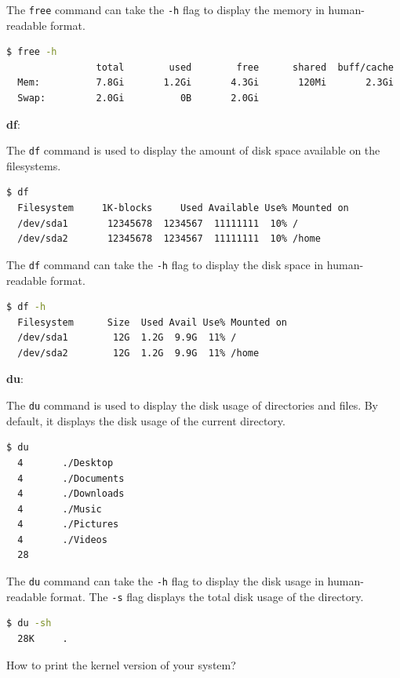 The \texttt{free} command can take the \texttt{-h} flag to display the memory in human-readable format.

\begin{lstlisting}[language=bash]
  $ free -h
                total        used        free      shared  buff/cache   available
  Mem:          7.8Gi       1.2Gi       4.3Gi       120Mi       2.3Gi       4.3Gi
  Swap:         2.0Gi          0B       2.0Gi
\end{lstlisting}

\textbf{df}:

The \texttt{df} command is used to display the amount of disk space available on the filesystems.

\begin{lstlisting}[language=bash]
  $ df
  Filesystem     1K-blocks     Used Available Use% Mounted on
  /dev/sda1       12345678  1234567  11111111  10% /
  /dev/sda2       12345678  1234567  11111111  10% /home
\end{lstlisting}

The \texttt{df} command can take the \texttt{-h} flag to display the disk space in human-readable format.

\begin{lstlisting}[language=bash]
  $ df -h
  Filesystem      Size  Used Avail Use% Mounted on
  /dev/sda1        12G  1.2G  9.9G  11% /
  /dev/sda2        12G  1.2G  9.9G  11% /home
\end{lstlisting}

\textbf{du}:

The \texttt{du} command is used to display the disk usage of directories and files.
By default, it displays the disk usage of the current directory.

\begin{lstlisting}[language=bash]
  $ du
  4       ./Desktop
  4       ./Documents
  4       ./Downloads
  4       ./Music
  4       ./Pictures
  4       ./Videos
  28
\end{lstlisting}

The \texttt{du} command can take the \texttt{-h} flag to display the disk usage in human-readable format.
The \texttt{-s} flag displays the total disk usage of the directory.

\begin{lstlisting}[language=bash]
  $ du -sh
  28K     .
\end{lstlisting}


\begin{qs}
  How to print the kernel version of your system?
\end{qs}

